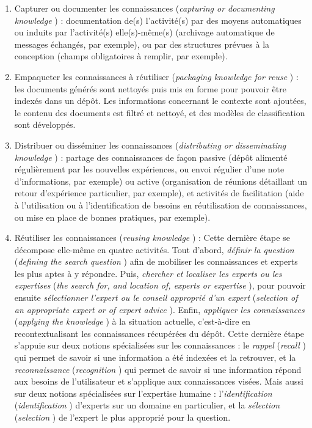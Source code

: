 \begin{enumerate}
\item Capturer ou documenter les connaissances (\og \textit{capturing or documenting knowledge} \fg) : documentation de(s) l'activité(s) par des moyens automatiques ou induits par l'activité(s) elle(s)-même(s) (archivage automatique de messages échangés, par exemple), ou par des structures prévues à la conception (champs obligatoires à remplir, par exemple).\\

\item Empaqueter les connaissances à réutiliser (\og \textit{packaging knowledge for reuse} \fg) : les documents générés sont nettoyés puis mis en forme pour pouvoir être indexés dans un dépôt.
Les informations concernant le contexte sont ajoutées, le contenu des documents est filtré et nettoyé, et des modèles de classification sont développés.\\

\item Distribuer ou disséminer les connaissances (\og \textit{distributing or disseminating knowledge} \fg) : partage des connaissances de façon passive (dépôt alimenté régulièrement par les nouvelles expériences, ou envoi régulier d'une note d'informations, par exemple) ou active (organisation de réunions détaillant un retour d'expérience particulier, par exemple), et activités de facilitation (aide à l'utilisation ou à l'identification de besoins en réutilisation de connaissances, ou mise en place de bonnes pratiques, par exemple).\\

\item Réutiliser les connaissances (\og \textit{reusing knowledge} \fg) : Cette dernière étape se décompose elle-même en quatre activités.
Tout d'abord, \textit{définir la question} (\og \textit{defining the search question} \fg) afin de mobiliser les connaissances et experts les plus aptes à y répondre.
Puis, \textit{chercher et localiser les experts ou les expertises} (\og \textit{the search for, and location of, experts or expertise} \fg), pour pouvoir ensuite \textit{sélectionner l'expert ou le conseil approprié d'un expert} (\og \textit{selection of an appropriate expert or of expert advice} \fg).
Enfin, \textit{appliquer les connaissances} (\og \textit{applying the knowledge} \fg) à la situation actuelle, c'est-à-dire en recontextualisant les connaissances récupérées du dépôt.
Cette dernière étape s'appuie sur deux notions spécialisées sur les connaissances : le \textit{rappel} (\og \textit{recall} \fg) qui permet de savoir si une information a été indexées et la retrouver, et la \textit{reconnaissance} (\og \textit{recognition} \fg) qui permet de savoir si une information répond aux besoins de l'utilisateur et s'applique aux connaissances visées.
Mais aussi sur deux notions spécialisées sur l'expertise humaine : l'\textit{identification} (\og \textit{identification} \fg) d'experts sur un domaine en particulier, et la \textit{sélection} (\og \textit{selection} \fg) de l'expert le plus approprié pour la question.
\end{enumerate}


